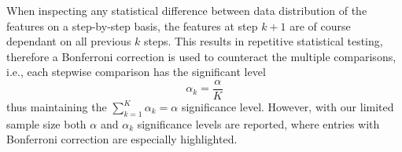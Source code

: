 When inspecting any statistical difference between data distribution of 
the features on a step-by-step basis, the features at step $k+1$ are of course 
dependant on all previous $k$ steps. This results in repetitive statistical 
testing, therefore a Bonferroni correction is used to counteract the multiple 
comparisons, i.e., each stepwise comparison has the significant level
\begin{equation}
\alpha_k=\frac{\alpha}{K}
\end{equation} 
thus maintaining the $\sum_{k=1}^K\alpha_k=\alpha$ significance level. 
However, with our limited sample size both $\alpha$ and $\alpha_k$ significance 
levels are reported, where entries with Bonferroni correction are especially 
highlighted.

{\setlength{\tabcolsep}{3pt} 
\begin{table}\centering
    \caption{Number of problem instances after segregating  w.r.t. 
    difficulty and trajectory.}
    \label{tbl:jrnd:feat:cnt}
    \quad\quad
\end{table}}

